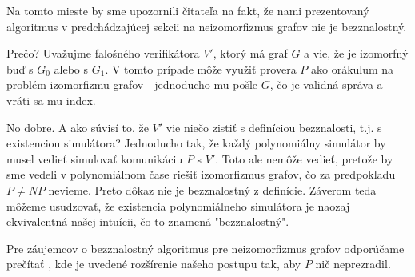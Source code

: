 \begin{poznamka}
    Na tomto mieste by sme upozornili čitateľa na fakt, že nami
    prezentovaný algoritmus v predchádzajúcej sekcii na neizomorfizmus grafov
    nie je bezznalostný.
    
    Prečo? Uvažujme falošného verifikátora $V'$,
    ktorý má graf $G$ a vie, že je izomorfný buď s $G_0$ alebo s
    $G_1$. V tomto prípade môže využiť provera $P$ ako orákulum na
    problém izomorfizmu grafov - jednoducho mu pošle $G$, čo je
    validná správa a vráti sa mu index.

    No dobre. A ako súvisí to, že $V'$ vie niečo zistiť s definíciou
    bezznalosti, t.j. s existenciou simulátora? Jednoducho tak, že
    každý polynomiálny simulátor by musel vedieť simulovať komunikáciu
    $P$ s $V'$. Toto ale nemôže vedieť, pretože by sme vedeli v
    polynomiálnom čase riešiť izomorfizmus grafov, čo za predpokladu
    $P\neq NP$ nevieme. Preto dôkaz nie je bezznalostný z definície.
    Záverom teda môžeme usudzovať, že existencia polynomiálneho
    simulátora je naozaj ekvivalentná našej intuícii, čo to znamená
    "bezznalostný".

    Pre záujemcov o bezznalostný algoritmus pre neizomorfizmus grafov
    odporúčame prečítať \cite{nig}, kde je uvedené rozšírenie našeho
    postupu tak, aby $P$ nič neprezradil.
\end{poznamka}
